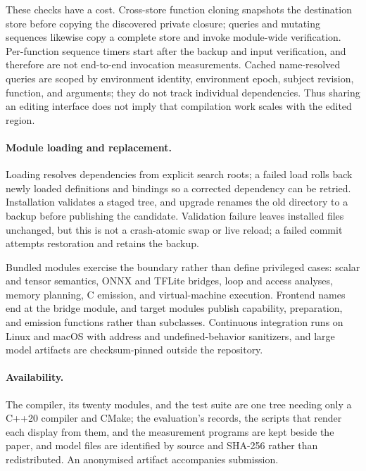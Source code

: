 \documentclass[sigplan,anonymous,review]{acmart}
\begin{document}
These checks have a cost. Cross-store function cloning snapshots the destination
store before copying the discovered private closure; queries and mutating
sequences likewise copy a complete store and invoke module-wide verification.
Per-function sequence timers start after the backup and input verification, and
therefore are not end-to-end invocation measurements. Cached name-resolved
queries are scoped by environment identity, environment epoch, subject revision,
function, and arguments; they do not track individual dependencies. Thus sharing
an editing interface does not imply that compilation work scales with the edited
region.

\paragraph{Module loading and replacement.}
Loading resolves dependencies from explicit search roots; a failed load rolls
back newly loaded definitions and bindings so a corrected dependency can be
retried. Installation validates a staged tree, and upgrade renames the old
directory to a backup before publishing the candidate. Validation failure
leaves installed files unchanged, but this is not a crash-atomic swap or live
reload; a failed commit attempts restoration and retains the backup.

Bundled modules exercise the boundary rather than define privileged cases:
scalar and tensor semantics, ONNX and TFLite bridges, loop and access
analyses, memory planning, C emission, and virtual-machine execution. Frontend
names end at the bridge module, and target modules publish capability,
preparation, and emission functions rather than subclasses. Continuous
integration runs on Linux and macOS with address and undefined-behavior
sanitizers, and large model artifacts are checksum-pinned outside the
repository.

\paragraph{Availability.}
The compiler, its twenty modules, and the test suite are one tree needing only a
C++20 compiler and CMake; the evaluation's records, the scripts that render each
display from them, and the measurement programs are kept beside the paper, and
model files are identified by source and SHA-256 rather than redistributed. An
anonymised artifact accompanies submission.
\end{document}
